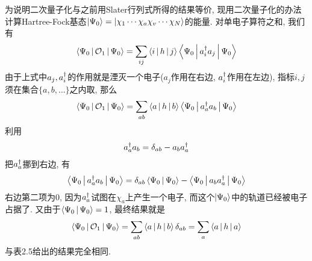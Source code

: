 为说明二次量子化与之前用Slater行列式所得的结果等价, 现用二次量子化的办法计算Hartree-Fock基态$\Ket{\Psi_0} = \Ket{\chi_1\cdots\chi_a\chi_v\cdots\chi_N}$的能量. 对单电子算符之和, 我们有
\begin{align}
\Braket{\Psi_0|\mathcal{O}_1|\Psi_0} = \sum_{ij}\Braket{i|h|j}\Braket{\Psi_0|a^\dagger_i a_j|\Psi_{0}}
\end{align}
由于上式中$a_j,a^\dagger_i$的作用就是湮灭一个电子($a_j$作用在右边, $a^\dagger_i$作用在左边), 指标$i,j$须在集合$\{a,b,\ldots\}$之内取, 那么
\begin{align}
\Braket{\Psi_0|\mathcal{O}_1|\Psi_0} = \sum_{ab}\Braket{a|h|b}\Braket{\Psi_0|a^\dagger_a a_b|\Psi_{0}}
\end{align}
利用
\begin{align}
a^\dagger_a a_b = \delta_{ab} - a_ba^\dagger_a
\end{align}
把$a^\dagger_a$挪到右边, 有
\begin{align}
\Braket{\Psi_0|a^\dagger_a a_b|\Psi_0} = \delta_{ab}\Braket{\Psi_0|\Psi_0} - \Braket{\Psi_0|a_ba^\dagger_a|\Psi_0}
\end{align}
右边第二项为$0$, 因为$a^\dagger_a$试图在$\chi_a$上产生一个电子, 而这个$\Ket{\Psi_0}$中的轨道已经被电子占据了. 又由于$\Braket{\Psi_0|\Psi_0} = 1$, 最终结果就是
\begin{align}
\Braket{\Psi_0|\mathcal{O}_1|\Psi_0} = \sum_{ab} \Braket{a|h|b}\delta_{ab} = \sum_a\Braket{a|h|a}
\end{align} 
与表2.5给出的结果完全相同.


